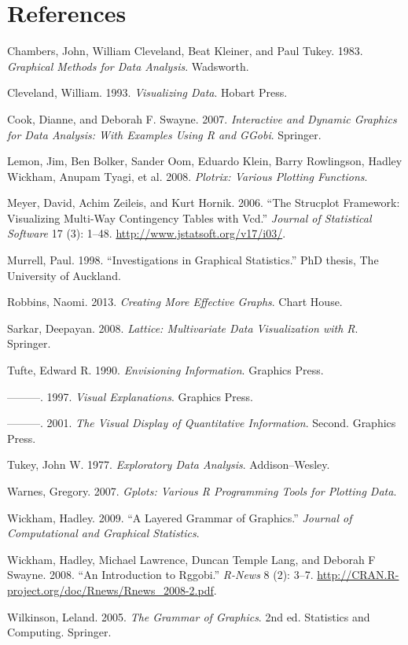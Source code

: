 \section*{References}\label{references}

\hypertarget{refs}{}
\hypertarget{ref-chambers:1983}{}
Chambers, John, William Cleveland, Beat Kleiner, and Paul Tukey. 1983.
\emph{Graphical Methods for Data Analysis}. Wadsworth.

\hypertarget{ref-cleveland:1993}{}
Cleveland, William. 1993. \emph{Visualizing Data}. Hobart Press.

\hypertarget{ref-cook:2007}{}
Cook, Dianne, and Deborah F. Swayne. 2007. \emph{Interactive and Dynamic
Graphics for Data Analysis: With Examples Using R and GGobi}. Springer.

\hypertarget{ref-plotrix}{}
Lemon, Jim, Ben Bolker, Sander Oom, Eduardo Klein, Barry Rowlingson,
Hadley Wickham, Anupam Tyagi, et al. 2008. \emph{Plotrix: Various
Plotting Functions}.

\hypertarget{ref-meyer:2006}{}
Meyer, David, Achim Zeileis, and Kurt Hornik. 2006. ``The Strucplot
Framework: Visualizing Multi-Way Contingency Tables with Vcd.''
\emph{Journal of Statistical Software} 17 (3): 1--48.
\url{http://www.jstatsoft.org/v17/i03/}.

\hypertarget{ref-murrell:1998}{}
Murrell, Paul. 1998. ``Investigations in Graphical Statistics.''
PhD thesis, The University of Auckland.

\hypertarget{ref-robbins:2004}{}
Robbins, Naomi. 2013. \emph{Creating More Effective Graphs}. Chart
House.

\hypertarget{ref-sarkar:2008}{}
Sarkar, Deepayan. 2008. \emph{Lattice: Multivariate Data Visualization
with R}. Springer.

\hypertarget{ref-tufte:1990}{}
Tufte, Edward R. 1990. \emph{Envisioning Information}. Graphics Press.

\hypertarget{ref-tufte:1997}{}
---------. 1997. \emph{Visual Explanations}. Graphics Press.

\hypertarget{ref-tufte:2001}{}
---------. 2001. \emph{The Visual Display of Quantitative Information}.
Second. Graphics Press.

\hypertarget{ref-tukey:1977}{}
Tukey, John W. 1977. \emph{Exploratory Data Analysis}. Addison--Wesley.

\hypertarget{ref-gplots}{}
Warnes, Gregory. 2007. \emph{Gplots: Various R Programming Tools for
Plotting Data}.

\hypertarget{ref-wickham:2007d}{}
Wickham, Hadley. 2009. ``A Layered Grammar of Graphics.'' \emph{Journal
of Computational and Graphical Statistics}.

\hypertarget{ref-wickham:2008b}{}
Wickham, Hadley, Michael Lawrence, Duncan Temple Lang, and Deborah F
Swayne. 2008. ``An Introduction to Rggobi.'' \emph{R-News} 8 (2): 3--7.
\url{http://CRAN.R-project.org/doc/Rnews/Rnews_2008-2.pdf}.

\hypertarget{ref-wilkinson:2006}{}
Wilkinson, Leland. 2005. \emph{The Grammar of Graphics}. 2nd ed.
Statistics and Computing. Springer.
